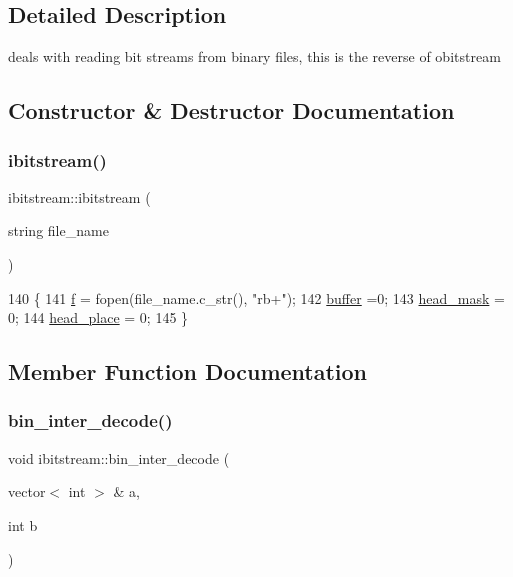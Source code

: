 \subsection{Detailed Description}
deals with reading bit streams from binary files, this is the reverse of obitstream 

\subsection{Constructor \& Destructor Documentation}
\mbox{\label{classibitstream_af5f00b64072ed3ffe495b7712a71e3eb}} 
\subsubsection{\texorpdfstring{ibitstream()}{ibitstream()}}
{\footnotesize\ttfamily ibitstream\+::ibitstream (\begin{DoxyParamCaption}\item[{string}]{file\+\_\+name }\end{DoxyParamCaption})\hspace{0.3cm}{\ttfamily [inline]}}


\begin{DoxyCode}
140                               \{
141     \hyperlink{classibitstream_a3ea2cdd0cf97820f0e1520c42e364308}{f} = fopen(file\_name.c\_str(), \textcolor{stringliteral}{"rb+"});
142     \hyperlink{classibitstream_a73f0b24d3d4402369f1abbb43f7f70ef}{buffer} =0;
143     \hyperlink{classibitstream_a48cd41991b6c29ea5120b53873a72a70}{head\_mask} = 0;
144     \hyperlink{classibitstream_a7b96359ac1534a5565e6e9b0cc53a0b3}{head\_place} = 0;
145   \}
\end{DoxyCode}


\subsection{Member Function Documentation}
\mbox{\label{classibitstream_a4d1bfd02f98f6af2ac4d80034b23e26d}} 
\subsubsection{\texorpdfstring{bin\+\_\+inter\+\_\+decode()}{bin\_inter\_decode()}\hspace{0.1cm}{\footnotesize\ttfamily [1/2]}}
{\footnotesize\ttfamily void ibitstream\+::bin\+\_\+inter\+\_\+decode (\begin{DoxyParamCaption}\item[{vector$<$ int $>$ \&}]{a,  }\item[{int}]{b }\end{DoxyParamCaption})}



